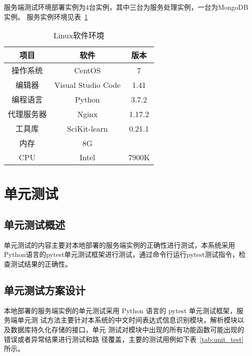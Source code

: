 服务端测试环境部署实例为4台实例，其中三台为服务处理实例，一台为MongoDB实例。 服务实例环境见表~\ref{tab:server_test}
\begin{table}[h]
    \centering
    \caption{Linux软件环境}
    \begin{tabular}{|*{3}{c|}}
        \hline
        项目       & 软件               & 版本   \\
        \hline
        操作系统   & CentOS             & 7      \\
        \hline
        编辑器     & Visual Studio Code & 1.41   \\
        编程语言   & Python             & 3.7.2  \\
        \hline
        代理服务器 & Nginx              & 1.17.2 \\
        \hline
        工具库     & SciKit-learn       & 0.21.1 \\
        \hline
        内存       & 8G                 &        \\
        \hline
        CPU        & Intel              & 7900K  \\
        \hline
    \end{tabular}
    \label{tab:server_test}
\end{table}


\section{单元测试}

\subsection{单元测试概述}

单元测试的内容主要对本地部署的服务端实例的正确性进行测试，本系统采用Python语言的pytest单元测试框架进行测试，通过命令行运行pytest测试指令，检查测试结果的正确性。

\subsection{单元测试方案设计}


本地部署的服务端实例的单元测试采用 Python 语言的 pytest 单元测试框架，服务端单元测
试方法主要针对本系统的中文时间表达式信息识别模块，解析模块以及数据库持久化存储的接口，单元
测试对模块中出现的所有功能函数可能出现的错误或者异常结果进行测试和路
径覆盖，主要的测试用例如下表~\ref{tab:unit_test} 所示。

